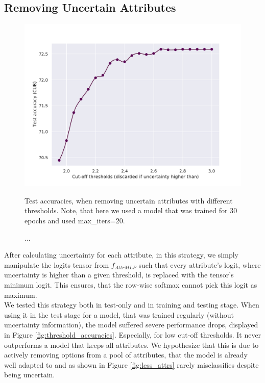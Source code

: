 \documentclass[a4paper,cleardoubleempty,BCOR1cm, 11pt]{report}
\begin{document}
\subsection{Removing Uncertain Attributes}
\begin{figure}[t!]
	\centering
	\begin{minipage}{0.45\textwidth}
		\centering
		\includegraphics[width=1\textwidth]{images/threshold_accuracy.pdf} 
		\caption{Test accuracies, when removing uncertain attributes with different thresholds. Note, that here we used a model that was trained for 30 epochs and used max\_iters=20.}
		\label{fig:threshold_accuracies}
	\end{minipage}\hfill
	\begin{minipage}{0.45\textwidth}
		\centering
		\caption{...}
		\label{fig:corr_matrix}
	\end{minipage}
\end{figure}
After calculating uncertainty for each attribute, in this strategy, we simply manipulate the logits tensor from $f_{AttrMLP}$ such that every attribute's logit, where uncertainty is higher than a given threshold, is replaced with the tensor's minimum logit. This ensures, that the row-wise softmax cannot pick this logit as maximum.\\
We tested this strategy both in test-only and in training and testing stage. When using it in the test stage for a model, that was trained regularly (without uncertainty information), the model suffered severe performance drops, displayed in Figure \ref{fig:threshold_accuracies}. Especially, for low cut-off thresholds. It never outperforms a model that keeps all attributes. We hypothesize that this is due to actively removing options from a pool of attributes, that the model is already well adapted to and as shown in Figure \ref{fig:less_attrs} rarely misclassifies despite being uncertain.
\end{document}
